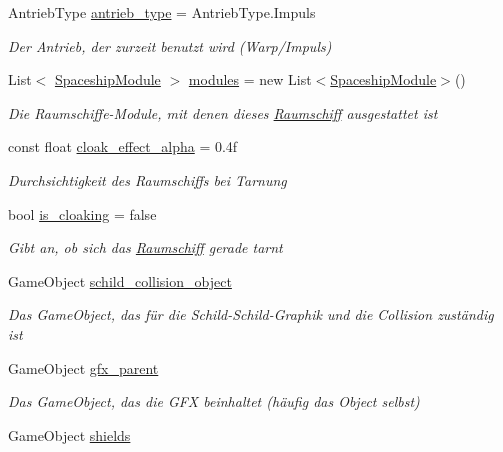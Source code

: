 \begin{DoxyCompactItemize}
Antrieb\+Type \hyperlink{class_spaceship_ad33632d0f3e88bdeae6f711044e53a4e}{antrieb\+\_\+type} = Antrieb\+Type.\+Impuls
\begin{DoxyCompactList}\small\item\em Der Antrieb, der zurzeit benutzt wird (Warp/\+Impuls) \end{DoxyCompactList}\item 
List$<$ \hyperlink{class_spaceship_module}{Spaceship\+Module} $>$ \hyperlink{class_spaceship_aad3c0baa850f85ef7432c0ea6f0e003e}{modules} = new List$<$\hyperlink{class_spaceship_module}{Spaceship\+Module}$>$()
\begin{DoxyCompactList}\small\item\em Die Raumschiffe-\/\+Module, mit denen dieses \hyperlink{class_raumschiff}{Raumschiff} ausgestattet ist \end{DoxyCompactList}\item 
const float \hyperlink{class_spaceship_a7a1ae8f60dc0535577c90ac06e5c86cd}{cloak\+\_\+effect\+\_\+alpha} = 0.\+4f
\begin{DoxyCompactList}\small\item\em Durchsichtigkeit des Raumschiffs bei Tarnung \end{DoxyCompactList}\item 
bool \hyperlink{class_spaceship_a012d6f0509e4e4c6afbeaa81b80c4b23}{is\+\_\+cloaking} = false
\begin{DoxyCompactList}\small\item\em Gibt an, ob sich das \hyperlink{class_raumschiff}{Raumschiff} gerade tarnt \end{DoxyCompactList}\item 
Game\+Object \hyperlink{class_spaceship_a40f7992de603fb76e22c3dcce1b63292}{schild\+\_\+collision\+\_\+object}
\begin{DoxyCompactList}\small\item\em Das Game\+Object, das für die Schild-\/\+Schild-\/\+Graphik und die Collision zuständig ist \end{DoxyCompactList}\item 
Game\+Object \hyperlink{class_spaceship_aa88ea0cfef593a18db011de1ca41c335}{gfx\+\_\+parent}
\begin{DoxyCompactList}\small\item\em Das Game\+Object, das die G\+FX beinhaltet (häufig das Object selbst) \end{DoxyCompactList}\item 
Game\+Object \hyperlink{class_spaceship_a128777395236ab7a2ef22f1f44ef903b}{shields}

\end{DoxyCompactItemize}

